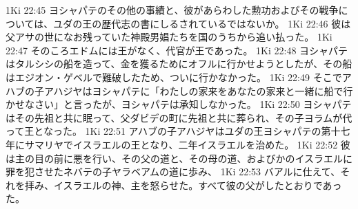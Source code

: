 1Ki 22:45  ヨシャパテのその他の事績と、彼があらわした勲功およびその戦争については、ユダの王の歴代志の書にしるされているではないか。
1Ki 22:46  彼は父アサの世になお残っていた神殿男娼たちを国のうちから追い払った。
1Ki 22:47  そのころエドムには王がなく、代官が王であった。
1Ki 22:48  ヨシャパテはタルシシの船を造って、金を獲るためにオフルに行かせようとしたが、その船はエジオン・ゲベルで難破したため、ついに行かなかった。
1Ki 22:49  そこでアハブの子アハジヤはヨシャパテに「わたしの家来をあなたの家来と一緒に船で行かせなさい」と言ったが、ヨシャパテは承知しなかった。
1Ki 22:50  ヨシャパテはその先祖と共に眠って、父ダビデの町に先祖と共に葬られ、その子ヨラムが代って王となった。
1Ki 22:51  アハブの子アハジヤはユダの王ヨシャパテの第十七年にサマリヤでイスラエルの王となり、二年イスラエルを治めた。
1Ki 22:52  彼は主の目の前に悪を行い、その父の道と、その母の道、およびかのイスラエルに罪を犯させたネバテの子ヤラベアムの道に歩み、
1Ki 22:53  バアルに仕えて、それを拝み、イスラエルの神、主を怒らせた。すべて彼の父がしたとおりであった。


